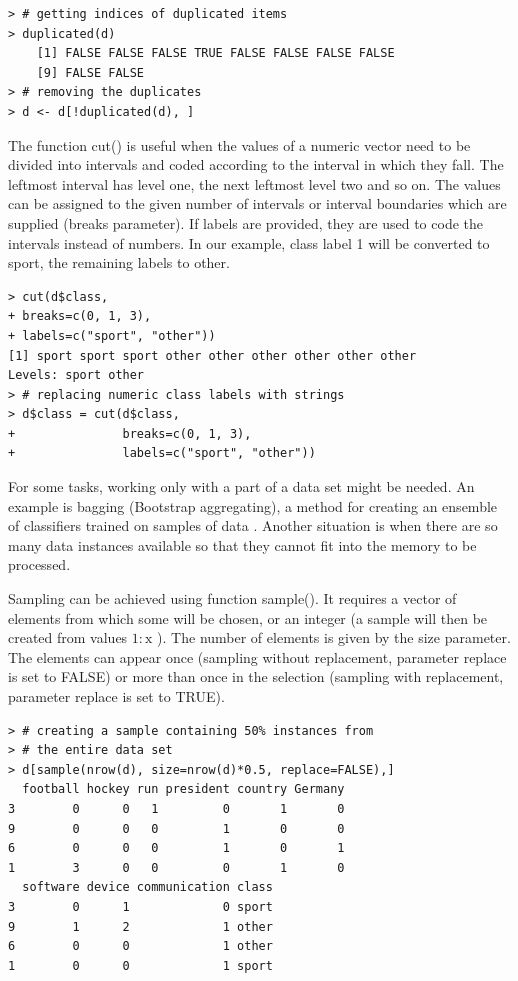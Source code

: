 \documentclass[11pt,openany,executivepaper]{book}
\begin{document}
\begin{verbatim}
> # getting indices of duplicated items
> duplicated(d)
    [1] FALSE FALSE FALSE TRUE FALSE FALSE FALSE FALSE
    [9] FALSE FALSE
> # removing the duplicates
> d <- d[!duplicated(d), ]
\end{verbatim}

The function cut() is useful when the values of a numeric vector need to be divided into intervals and coded according to the interval in which they fall. The leftmost interval has level one, the next leftmost level two and so on. The values can be assigned to the given number of intervals or interval boundaries which are supplied (breaks parameter). If labels are provided, they are used to code the intervals instead of numbers. In our example, class label 1 will be converted to sport, the remaining labels to other.

\begin{verbatim}
> cut(d$class,
+ breaks=c(0, 1, 3),
+ labels=c("sport", "other"))
[1] sport sport sport other other other other other other
Levels: sport other
> # replacing numeric class labels with strings
> d$class = cut(d$class,
+               breaks=c(0, 1, 3),
+               labels=c("sport", "other"))
\end{verbatim}

For some tasks, working only with a part of a data set might be needed. An example is bagging (Bootstrap aggregating), a method for creating an ensemble of classifiers trained on samples of data \cite{32}. Another situation is when there are so many data instances available so that they cannot fit into the memory to be processed.

Sampling can be achieved using function sample(). It requires a vector of elements from which some will be chosen, or an integer (a sample will then be created from values $1: \mathrm{x}$ ). The number of elements is given by the size parameter. The elements can appear once (sampling without replacement, parameter replace is set to FALSE) or more than once in the selection (sampling with replacement, parameter replace is set to TRUE).
\clearpage
\begin{verbatim}
> # creating a sample containing 50% instances from
> # the entire data set
> d[sample(nrow(d), size=nrow(d)*0.5, replace=FALSE),]
  football hockey run president country Germany
3        0      0   1         0       1       0
9        0      0   0         1       0       0
6        0      0   0         1       0       1
1        3      0   0         0       1       0
  software device communication class
3        0      1             0 sport
9        1      2             1 other
6        0      0             1 other
1        0      0             1 sport

\end{verbatim}
\end{document}
